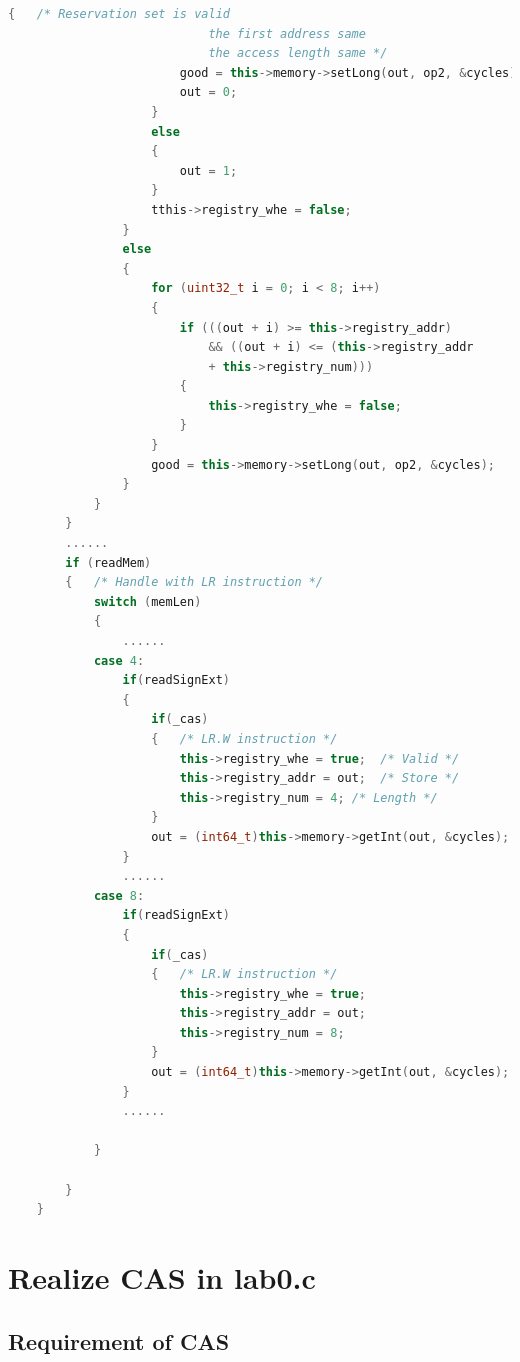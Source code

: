 \documentclass{article}
\begin{document}
\begin{lstlisting}[language=c++]
                    {   /* Reservation set is valid
                            the first address same
                            the access length same */
                        good = this->memory->setLong(out, op2, &cycles);
                        out = 0;
                    }
                    else
                    {
                        out = 1;
                    }
                    tthis->registry_whe = false;
                }
                else
                {
                    for (uint32_t i = 0; i < 8; i++) 
                    {
                        if (((out + i) >= this->registry_addr) 
                            && ((out + i) <= (this->registry_addr 
                            + this->registry_num)))
                        {
                            this->registry_whe = false;
                        }
                    }
                    good = this->memory->setLong(out, op2, &cycles);
                }
            }
        }
        ......
        if (readMem)
        {   /* Handle with LR instruction */
            switch (memLen)
            {
                ......
            case 4: 
                if(readSignExt)
                {
                    if(_cas)
                    {   /* LR.W instruction */
                        this->registry_whe = true;  /* Valid */
                        this->registry_addr = out;  /* Store */
                        this->registry_num = 4; /* Length */
                    }
                    out = (int64_t)this->memory->getInt(out, &cycles);
                }
                ......
            case 8:
                if(readSignExt)
                {
                    if(_cas)
                    {   /* LR.W instruction */
                        this->registry_whe = true;
                        this->registry_addr = out;
                        this->registry_num = 8;
                    }
                    out = (int64_t)this->memory->getInt(out, &cycles);
                }
                ......

            }

        }
    }


\end{lstlisting}

\section{Realize CAS in lab0.c}
\subsection{Requirement of CAS}
\end{document}

